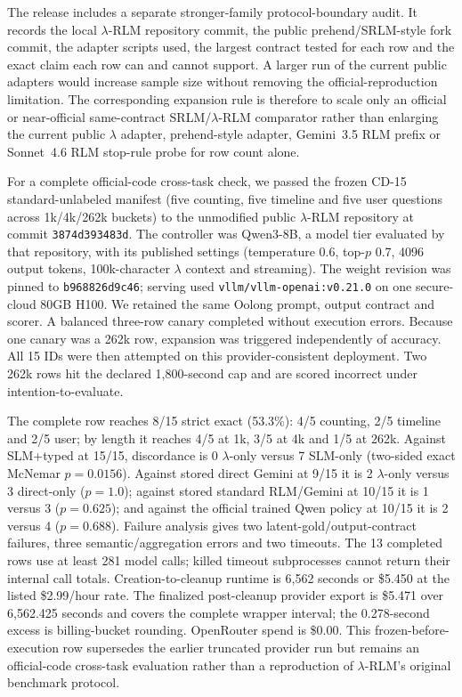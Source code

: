 \documentclass[letterpaper]{article}
\begin{document}
The release includes a separate stronger-family protocol-boundary audit. It records the local $\lambda$-RLM repository commit, the public prehend/SRLM-style fork commit, the adapter scripts used, the largest contract tested for each row and the exact claim each row can and cannot support. A larger run of the current public adapters would increase sample size without removing the official-reproduction limitation. The corresponding expansion rule is therefore to scale only an official or near-official same-contract SRLM/$\lambda$-RLM comparator rather than enlarging the current public $\lambda$ adapter, prehend-style adapter, Gemini~3.5 RLM prefix or Sonnet~4.6 RLM stop-rule probe for row count alone.

For a complete official-code cross-task check, we passed the frozen CD-15 standard-unlabeled manifest (five counting, five timeline and five user questions across 1k/4k/262k buckets) to the unmodified public $\lambda$-RLM repository at commit \texttt{3874d393483d}. The controller was Qwen3-8B, a model tier evaluated by that repository, with its published settings (temperature 0.6, top-$p$ 0.7, 4096 output tokens, 100k-character $\lambda$ context and streaming). The weight revision was pinned to \texttt{b968826d9c46}; serving used \texttt{vllm/vllm-openai:v0.21.0} on one secure-cloud 80GB H100. We retained the same Oolong prompt, output contract and scorer. A balanced three-row canary completed without execution errors. Because one canary was a 262k row, expansion was triggered independently of accuracy. All 15 IDs were then attempted on this provider-consistent deployment. Two 262k rows hit the declared 1,800-second cap and are scored incorrect under intention-to-evaluate.

The complete row reaches 8/15 strict exact (53.3\%): 4/5 counting, 2/5 timeline and 2/5 user; by length it reaches 4/5 at 1k, 3/5 at 4k and 1/5 at 262k. Against SLM+typed at 15/15, discordance is 0 $\lambda$-only versus 7 SLM-only (two-sided exact McNemar $p{=}0.0156$). Against stored direct Gemini at 9/15 it is 2 $\lambda$-only versus 3 direct-only ($p{=}1.0$); against stored standard RLM/Gemini at 10/15 it is 1 versus 3 ($p{=}0.625$); and against the official trained Qwen policy at 10/15 it is 2 versus 4 ($p{=}0.688$). Failure analysis gives two latent-gold/output-contract failures, three semantic/aggregation errors and two timeouts. The 13 completed rows use at least 281 model calls; killed timeout subprocesses cannot return their internal call totals. Creation-to-cleanup runtime is 6,562 seconds or \$5.450 at the listed \$2.99/hour rate. The finalized post-cleanup provider export is \$5.471 over 6,562.425 seconds and covers the complete wrapper interval; the 0.278-second excess is billing-bucket rounding. OpenRouter spend is \$0.00. This frozen-before-execution row supersedes the earlier truncated provider run but remains an official-code cross-task evaluation rather than a reproduction of $\lambda$-RLM's original benchmark protocol.
\end{document}
